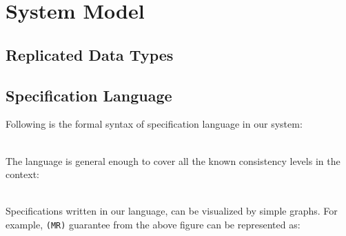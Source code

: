 \newpage
\section{System Model}
\subsection{Replicated Data Types}
\subsection{Specification Language}
Following is the formal syntax of specification language in our system:

\\ The language is general enough to cover all  the known consistency
levels in the context:

\\ Specifications written in our language, can be visualized by simple
graphs. For example, \texttt{(MR)} guarantee from the above figure can
be represented as:

